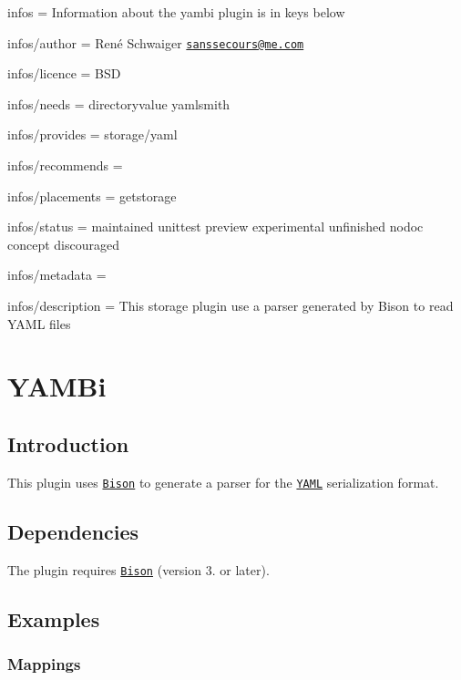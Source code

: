 
\begin{DoxyItemize}
\item infos = Information about the yambi plugin is in keys below
\item infos/author = René Schwaiger \href{mailto:sanssecours@me.com}{\tt sanssecours@me.\+com}
\item infos/licence = B\+SD
\item infos/needs = directoryvalue yamlsmith
\item infos/provides = storage/yaml
\item infos/recommends =
\item infos/placements = getstorage
\item infos/status = maintained unittest preview experimental unfinished nodoc concept discouraged
\item infos/metadata =
\item infos/description = This storage plugin use a parser generated by Bison to read Y\+A\+ML files
\end{DoxyItemize}\hypertarget{md_src_plugins_yambi_README_src_plugins_yambi_README_md}{}\section{Y\+A\+M\+Bi}\label{md_src_plugins_yambi_README_src_plugins_yambi_README_md}
\subsection*{Introduction}

This plugin uses \href{https://www.gnu.org/software/bison}{\tt Bison} to generate a parser for the \href{http://yaml.org}{\tt Y\+A\+ML} serialization format.

\subsection*{Dependencies}

The plugin requires \href{https://repology.org/metapackage/bison/versions}{\tt Bison} (version 3. or later).

\subsection*{Examples}

\subsubsection*{Mappings}


